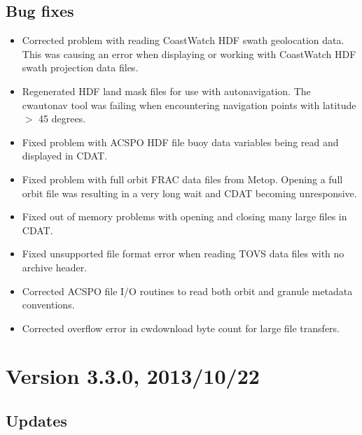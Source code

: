 \subsection*{ Bug fixes}
\begin{itemize}

  \item Corrected problem with reading CoastWatch HDF swath
    geolocation data.  This was causing an error when displaying
    or working with CoastWatch HDF swath projection data files.

  \item Regenerated HDF land mask files for use with
    autonavigation.  The cwautonav tool was failing when
    encountering navigation points with latitude $>$ 45 degrees.

  \item Fixed problem with ACSPO HDF file buoy data variables
    being read and displayed in CDAT.

  \item Fixed problem with full orbit FRAC data files from Metop.
    Opening a full orbit file was resulting in a very long wait
    and CDAT becoming unresponsive.

  \item Fixed out of memory problems with opening and closing
    many large files in CDAT.

  \item Fixed unsupported file format error when reading TOVS
    data files with no archive header.

  \item Corrected ACSPO file I/O routines to read both orbit and
    granule metadata conventions.

  \item Corrected overflow error in cwdownload byte count for
    large file transfers.

\end{itemize}


\section*{Version 3.3.0, 2013/10/22}

\subsection*{ Updates}

